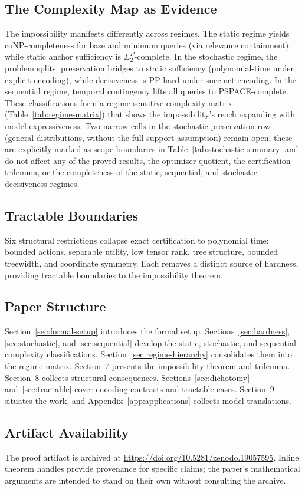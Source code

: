 \subsection{The Complexity Map as Evidence}

The impossibility manifests differently across regimes. The static regime yields coNP-completeness for base and minimum queries (via relevance containment), while static anchor sufficiency is $\Sigma_2^P$-complete. In the stochastic regime, the problem splits: preservation bridges to static sufficiency (polynomial-time under explicit encoding), while decisiveness is PP-hard under succinct encoding. In the sequential regime, temporal contingency lifts all queries to PSPACE-complete. These classifications form a regime-sensitive complexity matrix (Table~\ref{tab:regime-matrix}) that shows the impossibility's reach expanding with model expressiveness. Two narrow cells in the stochastic-preservation row (general distributions, without the full-support assumption) remain open; these are explicitly marked as scope boundaries in Table~\ref{tab:stochastic-summary} and do not affect any of the proved results, the optimizer quotient, the certification trilemma, or the completeness of the static, sequential, and stochastic-decisiveness regimes.

\subsection{Tractable Boundaries}

Six structural restrictions collapse exact certification to polynomial time: bounded actions, separable utility, low tensor rank, tree structure, bounded treewidth, and coordinate symmetry. Each removes a distinct source of hardness, providing tractable boundaries to the impossibility theorem.

\subsection{Paper Structure}

Section~\ref{sec:formal-setup} introduces the formal setup. Sections~\ref{sec:hardness}, \ref{sec:stochastic}, and \ref{sec:sequential} develop the static, stochastic, and sequential complexity classifications. Section~\ref{sec:regime-hierarchy} consolidates them into the regime matrix. Section~7 presents the impossibility theorem and trilemma. Section~8 collects structural consequences. Sections~\ref{sec:dichotomy} and~\ref{sec:tractable} cover encoding contrasts and tractable cases. Section~9 situates the work, and Appendix~\ref{app:applications} collects model translations.

\subsection{Artifact Availability}

The proof artifact is archived at \url{https://doi.org/10.5281/zenodo.19057595}. Inline theorem handles provide provenance for specific claims; the paper's mathematical arguments are intended to stand on their own without consulting the archive.
